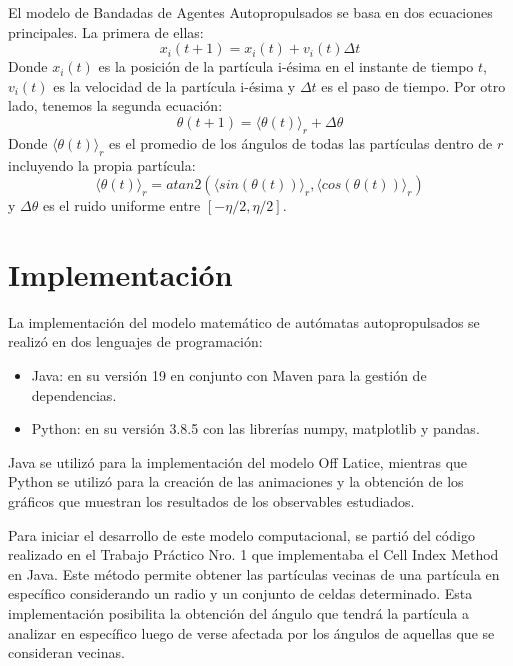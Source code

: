 \documentclass[11pt, a4paper]{article}
\begin{document}
            El modelo de Bandadas de Agentes Autopropulsados se basa en dos ecuaciones principales. La primera de ellas:
            \begin{equation}
                x_i(t+1) = x_i(t) + v_i(t) \Delta t
            \end{equation}
            Donde $x_i(t)$ es la posición de la partícula i-ésima en el instante de tiempo $t$, $v_i(t)$ es la velocidad de la partícula i-ésima
            y $\Delta t$ es el paso de tiempo.
            Por otro lado, tenemos la segunda ecuación:
            \begin{equation}
                \theta(t+1) = \langle \theta(t) \rangle_r+ \Delta \theta
            \end{equation}
            Donde $\langle \theta(t) \rangle_r$ es el promedio de los ángulos de todas las partículas dentro de $r$ incluyendo la propia
            partícula:
            \begin{equation}
                \langle \theta(t) \rangle_r = atan2(\langle sin(\theta(t)) \rangle_r, \langle cos(\theta(t)) \rangle_r)
            \end{equation}
            y $\Delta \theta$ es el ruido uniforme entre $[-\eta/2, \eta/2]$.

    \newpage

    \section{Implementación}

    La implementación del modelo matemático de autómatas autopropulsados se realizó en dos lenguajes de programación:
    \begin{itemize}
        \item Java: en su versión 19 en conjunto con Maven para la gestión de dependencias.
        \item Python: en su versión 3.8.5 con las librerías numpy, matplotlib y pandas.
    \end{itemize}

    Java se utilizó para la implementación del modelo Off Latice, mientras que Python se utilizó para la creación de las
    animaciones y la obtención de los gráficos que muestran los resultados de los observables estudiados.

    Para iniciar el desarrollo de este modelo computacional, se partió del código realizado en el Trabajo Práctico Nro. 1 que
    implementaba el Cell Index Method en Java. Este método permite obtener las partículas vecinas de una partícula en específico
    considerando un radio y un conjunto de celdas determinado. Esta implementación posibilita la obtención del ángulo que tendrá
    la partícula a analizar en específico luego de verse afectada por los ángulos de aquellas que se consideran vecinas.
\end{document}
